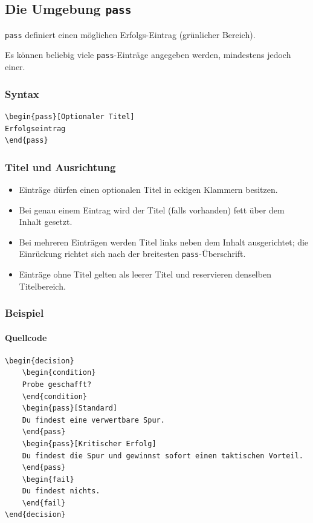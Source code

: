 \subsection{Die Umgebung \texttt{pass}}

\verb|pass| definiert einen möglichen Erfolgs-Eintrag
(grünlicher Bereich).

Es können beliebig viele \verb|pass|-Einträge angegeben werden,
mindestens jedoch einer.

\subsubsection*{Syntax}

\begin{Verbatim}
\begin{pass}[Optionaler Titel]
Erfolgseintrag
\end{pass}
\end{Verbatim}

\subsubsection*{Titel und Ausrichtung}

\begin{itemize}
\item Einträge dürfen einen optionalen Titel in eckigen Klammern besitzen.
\item Bei genau einem Eintrag wird der Titel (falls vorhanden) fett über dem Inhalt gesetzt.
\item Bei mehreren Einträgen werden Titel links neben dem Inhalt ausgerichtet;
      die Einrückung richtet sich nach der breitesten \verb|pass|-Überschrift.
\item Einträge ohne Titel gelten als leerer Titel und reservieren denselben Titelbereich.
\end{itemize}

\subsubsection*{Beispiel}

\paragraph{Quellcode}

\begin{Verbatim}
\begin{decision}
    \begin{condition}
    Probe geschafft?
    \end{condition}
    \begin{pass}[Standard]
    Du findest eine verwertbare Spur.
    \end{pass}
    \begin{pass}[Kritischer Erfolg]
    Du findest die Spur und gewinnst sofort einen taktischen Vorteil.
    \end{pass}
    \begin{fail}
    Du findest nichts.
    \end{fail}
\end{decision}
\end{Verbatim}


